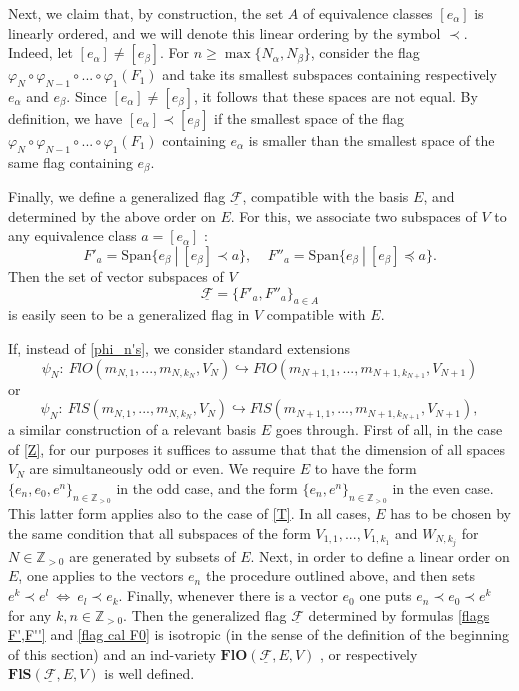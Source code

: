 \documentclass[12pt]{amsart}
\renewcommand{\phi}{\varphi}
\theoremstyle{definition}
\begin{document}
Next, we claim that, by construction, 
the set $A$ of equivalence classes $[e_{\alpha}]$ is linearly 
ordered, and we will denote this linear ordering by the symbol 
$\prec$. Indeed, let $[e_{\alpha}]\ne[e_{\beta}]$. For 
$n\ge\max\{N_{\alpha},N_{\beta}\}$, consider the flag 
$\phi_N\circ\phi_{N-1}\circ...\circ\phi_1(F_1)$
and take its smallest subspaces containing respectively 
$e_{\alpha}$ and $e_{\beta}$. Since $[e_{\alpha}]\ne
[e_{\beta}]$, it follows that these spaces are not equal. 
By definition, we have $[e_{\alpha}]\prec[e_{\beta}]$ if the 
smallest space of the flag $\phi_N\circ\phi_{N-1}\circ...\circ
\phi_1(F_1)$ containing $e_{\alpha}$ is smaller than the 
smallest space of the same flag containing $e_{\beta}$. 

Finally, we define a generalized flag 
$\mathcal{\underline{F}}$, compatible with the 
basis $E$, and determined by the above order on $E$. For this, 
we associate two subspaces of $V$ to any equivalence class 
$a=[e_{\alpha}]$ :
\begin{equation}\label{flags F',F''}
F'_a=\mathrm{Span}\{e_{\beta}\ |\ [e_{\beta}]\prec a\}, \ \ \ 
\ \ F''_a=\mathrm{Span}\{e_{\beta}\ |\ [e_{\beta}]\preccurlyeq 
a\}.
\end{equation}
Then the set of vector subspaces of $V$
\begin{equation}\label{flag cal F0}
\mathcal{\underline{F}}=\{F'_a,F''_a\}_{a\in A}
\end{equation}
is easily seen to be a generalized flag in $V$ compatible with 
$E$. 

If, instead of \eqref{phi_n's}, we consider standard extensions
\begin{equation}\label{Z}
\psi_N:\ FlO(m_{N,1},...,m_{N,k_N},V_N)\hookrightarrow
FlO(m_{N+1,1},...,m_{N+1,k_{N+1}},V_{N+1})
\end{equation}
or
\begin{equation}\label{T}
\psi_N:\ FlS(m_{N,1},...,m_{N,k_N},V_N)\hookrightarrow
FlS(m_{N+1,1},...,m_{N+1,k_{N+1}},V_{N+1}),
\end{equation}
a similar construction of a relevant basis $E$ goes through.
First of all, in the case of \eqref{Z}, for our purposes it
suffices to assume that that the dimension of all spaces $V_N$
are simultaneously odd or even. We require $E$ to have the 
form $\{e_n,e_0,e^n\}_{n\in\mathbb{Z}_{>0}}$ in the odd case, 
and the form $\{e_n,e^n\}_{n\in\mathbb{Z}_{>0}}$ in the even 
case.
This latter form applies also to the case of \eqref{T}. In all
cases, $E$ has to be chosen by the same condition that all
subspaces of the form $V_{1,1},...,V_{1,k_1}$ and $W_{N,k_j}$
for $N\in\mathbb{Z}_{>0}$ are generated by subsets of $E$.
Next, in order to define a linear order on $E$, one applies to
the vectors $e_n$ the procedure outlined above, and then sets
$e^k\prec e^l\ \Leftrightarrow\ e_l\prec e_k$. Finally,
whenever there is a vector $e_0$ one puts $e_n\prec e_0\prec
e^k$ for any $k,n\in\mathbb{Z}_{>0}$. Then the generalized 
flag $\mathcal{\underline{F}}$ determined by formulas 
\eqref{flags F',F''} and \eqref{flag cal F0} is isotropic (in
the sense of the definition of the beginning of this section)
and an ind-variety $\mathbf{FlO}(\mathcal{\underline{F}},E,V)$ , or respectively $\mathbf{FlS}(\mathcal{\underline{F}},E,V)$
is well defined.
\end{document}
